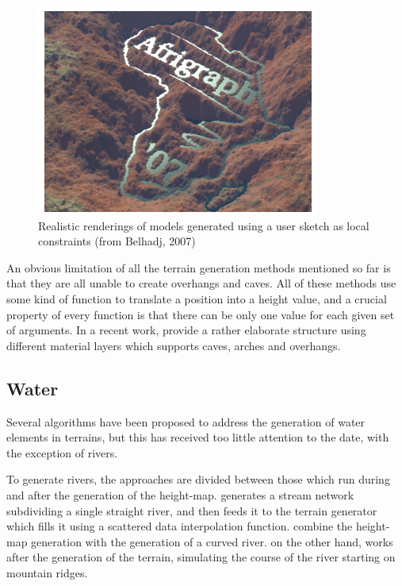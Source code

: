 \documentclass{acmtog}
\begin{document}
\begin{figure}[!htp]
	\begin{center}
		\includegraphics[width=\columnwidth]{images/constrained.png}
	\end{center}
	\caption{Realistic renderings of models generated using a user sketch as local constraints (from Belhadj, 2007)}
\end{figure}

An obvious limitation of all the terrain generation methods mentioned so far is that they are all unable to create overhangs and caves. All of these methods use some kind of function to translate a position into a height value, and a crucial property of every function is that there can be only one value for each given set of arguments. In a recent work, \cite{Peytavie09} provide a rather elaborate structure using different material layers which supports caves, arches and overhangs.

\subsection{Water}
Several algorithms have been proposed to address the generation of water elements in terrains, but this has received too little attention to the date, with the exception of rivers.

To generate rivers, the approaches are divided between those which run during and after the generation of the height-map. \cite{Kelley88} generates a stream network subdividing a single straight river, and then feeds it to the terrain generator which fills it using a scattered data interpolation function. \cite{Prusinkiewicz93} combine the height-map generation with the generation of a curved river. \cite{Belhadj05} on the other hand, works after the generation of the terrain, simulating the course of the river starting on mountain ridges.
\end{document}
